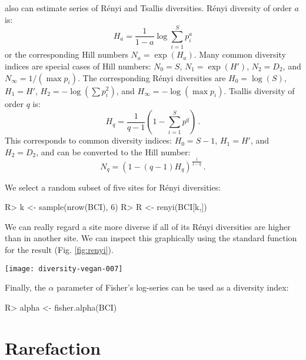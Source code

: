 \documentclass[article,nojss]{jss}
\begin{document}
 also can estimate series of R\'{e}nyi and Tsallis
diversities. R{\'e}nyi diversity of order $a$ is:
\begin{equation}
H_a = \frac{1}{1-a} \log \sum_{i=1}^S p_i^a
\end{equation}
or the corresponding Hill numbers $N_a = \exp(H_a)$.  Many common
diversity indices are special cases of Hill numbers: $N_0 = S$, $N_1 =
\exp(H')$, $N_2 = D_2$, and $N_\infty = 1/(\max p_i)$. The
corresponding R\'{e}nyi diversities are $H_0 = \log(S)$, $H_1 = H'$, $H_2 =
- \log(\sum p_i^2)$, and $H_\infty = - \log(\max p_i)$.  
Tsallis diversity of order $q$ is:
\begin{equation}
  H_q = \frac{1}{q-1} \left(1 - \sum_{i=1}^S p^q \right) \, .
\end{equation}
This corresponds to common diversity indices: $H_0 = S-1$, $H_1 = H'$,
and $H_2 = D_2$, and can be converted to the Hill number:
\begin{equation}
  N_q = (1 - (q-1) H_q )^\frac{1}{1-q} \, .
\end{equation}

We select a random subset of five sites for R\'{e}nyi diversities:
\begin{Schunk}
\begin{Sinput}
R> k <- sample(nrow(BCI), 6)
R> R <- renyi(BCI[k,])
\end{Sinput}
\end{Schunk}
We can really regard a site more diverse if all of its R\'{e}nyi
diversities are higher than in another site.  We can inspect this
graphically using the standard  function for the
 result (Fig. \ref{fig:renyi}).
\begin{SCfigure}
\texttt{[image: diversity-vegan-007]}
\caption{R\'{e}nyi diversities in six randomly selected plots. The plot
  uses Trellis graphics with a separate panel for each site. The dots
  show the values for sites, and the lines the extremes and median in
  the data set.}
\label{fig:renyi}
\end{SCfigure}

Finally, the $\alpha$ parameter of Fisher's log-series can be used as
a diversity index:
\begin{Schunk}
\begin{Sinput}
R> alpha <- fisher.alpha(BCI)
\end{Sinput}
\end{Schunk}

\section{Rarefaction}
\end{document}
